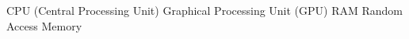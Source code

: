 \documentclass{article}
\begin{document}
CPU (Central Processing Unit)
Graphical Processing Unit (GPU)
RAM
Random Access Memory
\checkacronyms{}
\end{document}
